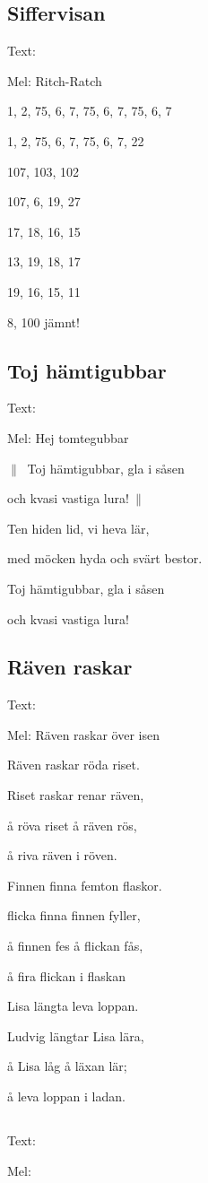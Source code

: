 

\pagestyle{Tungrullare}



\subsection{\textbf{Siffervisan}}

Text: 

Mel: Ritch-Ratch\bigskip


1, 2, 75, 6, 7, 75, 6, 7, 75, 6, 7

1, 2, 75, 6, 7, 75, 6, 7, 22

107, 103, 102

107, 6, 19, 27

17, 18, 16, 15

13, 19, 18, 17

19, 16, 15, 11

8, 100 jämnt!

\subsection{\textbf{Toj hämtigubbar}}

Text: 

Mel: Hej tomtegubbar\bigskip

$\|\:$ Toj hämtigubbar, gla i såsen

och kvasi vastiga lura!$\:\|$\bigskip

Ten hiden lid, vi heva lär,

med möcken hyda och svärt bestor.\bigskip

Toj hämtigubbar, gla i såsen

och kvasi vastiga lura!

\subsection{\textbf{Räven raskar}}

Text: 

Mel: Räven raskar över isen\bigskip

Räven raskar röda riset.

Riset raskar renar räven,

å röva riset å räven rös,

å riva räven i röven.\bigskip

Finnen finna femton flaskor.

flicka finna finnen fyller,

å finnen fes å flickan fås,

å fira flickan i flaskan\bigskip

Lisa längta leva loppan.

Ludvig längtar Lisa lära,

å Lisa låg å läxan lär;

å leva loppan i ladan. 

\subsection{\textbf{}}

Text: 

Mel: \bigskip

\newpage